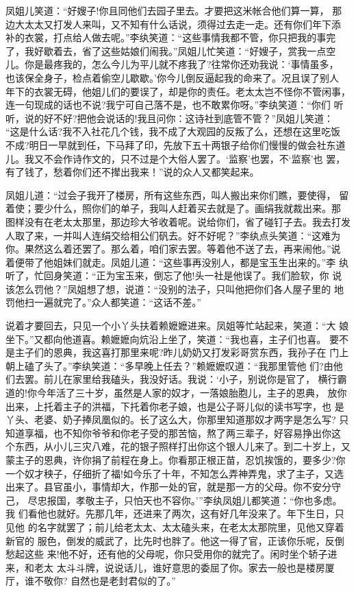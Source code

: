 凤姐儿笑道：“好嫂子!你且同他们去园子里去。才要把这米帐合他们算一算，
那边大太太又打发人来叫，又不知有什么话说，须得过去走一走。还有你们年下添
补的衣裳，打点给人做去呢。”李纨笑道：“这些事情我都不管，你只把我的事完
了，我好歇着去，省了这些姑娘们闹我。”凤姐儿忙笑道：“好嫂子，赏我一点空
儿。你是最疼我的，怎么今儿为平儿就不疼我了?往常你还劝我说：‘事情虽多，
也该保全身子，检点着偷空儿歇歇。’你今儿倒反逼起我的命来了。况且误了别人
年下的衣裳无碍，他姐儿们的要误了，却是你的责任。老太太岂不怪你不管闲事，
连一句现成的话也不说?我宁可自己落不是，也不敢累你呀。”李纨笑道：“你们
听听，说的好不好?把他会说话的!我且问你：这诗社到底管不管？”凤姐儿笑道：
“这是什么话?我不入社花几个钱，我不成了大观园的反叛了么，还想在这里吃饭
不成?明日一早就到任，下马拜了印，先放下五十两银子给你们慢慢的做会社东道
儿。我又不会作诗作文的，只不过是个大俗人罢了。‘监察’也罢，不‘监察’也
罢，有了钱了，愁着你们还不撵出我来！”说的众人又都笑起来。

凤姐儿道：“过会子我开了楼房，所有这些东西，叫人搬出来你们瞧，要使得，
留着使；要少什么，照你们的单子，我叫人赶着买去就是了。画绢我就裁出来。那
图样没有在老太太那里，那边珍大爷收着呢。说给你们，省了碰钉子去。我去打发
人取了来，一并叫人连绢交给相公们矾去。好不好呢？”李纨点头笑道：“这难为
你。果然这么着还罢了。那么着，咱们家去罢。等着他不送了去，再来闹他。”说
着便带了他姐妹们就走。凤姐儿道：“这些事再没别人，都是宝玉生出来的。”李
纨听了，忙回身笑道：“正为宝玉来，倒忘了他!头一社是他误了。我们脸软，你
说该怎么罚他？”凤姐想了想，说道：“没别的法子，只叫他把你们各人屋子里的
地罚他扫一遍就完了。”众人都笑道：“这话不差。”

说着才要回去，只见一个小丫头扶着赖嬷嬷进来。凤姐等忙站起来，笑道：“大
娘坐下。”又都向他道喜。赖嬷嬷向炕沿上坐了，笑道：“我也喜，主子们也喜。
要不是主子们的恩典，我这喜打那里来呢?昨儿奶奶又打发彩哥赏东西，我孙子在
门上朝上磕了头了。”李纨笑道：“多早晚上任去？”赖嬷嬷叹道：“我那里管他
们?由他们去罢。前儿在家里给我磕头，我没好话。我说：‘小子，别说你是官了，
横行霸道的!你今年活了三十岁，虽然是人家的奴才，一落娘胎胞儿，主子的恩典，
放你出来，上托着主子的洪福，下托着你老子娘，也是公子哥儿似的读书写字，也
是丫头、老婆、奶子捧凤凰似的。长了这么大，你那里知道那奴才两字是怎么写?
只知道享福，也不知你爷爷和你老子受的那苦恼，熬了两三辈子，好容易挣出你这
个东西，从小儿三灾八难，花的银子照样打出你这个银人儿来了。到二十岁上，又
蒙主子的恩典，许你捐了前程在身上。你看那正根正苗，忍饥挨饿的，要多少?你
一个奴才秧子，仔细折了福!如今乐了十年，不知怎么弄神弄鬼，求了主子，又选
出来了。县官虽小，事情却大，作那一处的官，就是那一方的父母。你不安分守己，
尽忠报国，孝敬主子，只怕天也不容你。’”李纨凤姐儿都笑道：“你也多虑。我
们看他也就好。先那几年，还进来了两次，这有好几年没来了。年下生日，只见他
的名字就罢了；前儿给老太太、太太磕头来，在老太太那院里，见他又穿着新官的
服色，倒发的威武了，比先时也胖了。他这一得了官，正该你乐呢，反倒愁起这些
来!他不好，还有他的父母呢，你只受用你的就完了。闲时坐个轿子进来，和老太
太斗斗牌，说说话儿，谁好意思的委屈了你。家去一般也是楼房厦厅，谁不敬你?
自然也是老封君似的了。”

